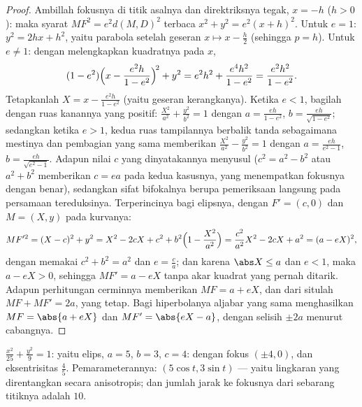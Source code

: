 \begin{proof}
Ambillah fokusnya di titik asalnya dan direktriksnya tegak, $x = -h$
($h > 0$): maka syarat $MF^2 = e^2 d(M, D)^2$ terbaca $x^2 + y^2 =
e^2 (x + h)^2$. Untuk $e = 1$: $y^2 = 2hx + h^2$, yaitu parabola setelah
geseran $x \mapsto x - \frac h2$ (sehingga $p = h$). Untuk $e \neq 1$:
dengan melengkapkan kuadratnya pada $x$,
\[
(1 - e^2)\Bigl(x - \frac{e^2 h}{1 - e^2}\Bigr)^{\!2} + y^2
= e^2h^2 + \frac{e^4 h^2}{1 - e^2}
= \frac{e^2 h^2}{1 - e^2} .
\]
Tetapkanlah $X = x - \frac{e^2h}{1-e^2}$ (yaitu geseran kerangkanya). Ketika $e < 1$,
bagilah dengan ruas kanannya yang positif:
$\frac{X^2}{a^2} + \frac{y^2}{b^2} = 1$ dengan $a = \frac{eh}{1 -
e^2}$, $b = \frac{eh}{\sqrt{1-e^2}}$; sedangkan ketika $e > 1$, kedua ruas
tampilannya berbalik tanda sebagaimana mestinya dan pembagian yang sama memberikan
$\frac{X^2}{a^2} - \frac{y^2}{b^2} = 1$ dengan $a = \frac{eh}{e^2 -
1}$, $b = \frac{eh}{\sqrt{e^2 - 1}}$. Adapun nilai $c$ yang dinyatakannya
menyusul ($c^2 = a^2 - b^2$ atau $a^2 + b^2$ memberikan $c = ea$ pada kedua
kasusnya, yang menempatkan fokusnya dengan benar), sedangkan sifat bifokalnya berupa
pemeriksaan langsung pada persamaan tereduksinya. Terperincinya bagi
elipsnya, dengan $F' = (c, 0)$ dan $M = (X, y)$ pada kurvanya:
\[
MF'^2 = (X - c)^2 + y^2
= X^2 - 2cX + c^2 + b^2\Bigl(1 - \frac{X^2}{a^2}\Bigr)
= \frac{c^2}{a^2}X^2 - 2cX + a^2
= (a - eX)^2 ,
\]
dengan memakai $c^2 + b^2 = a^2$ dan $e = \frac ca$; dan karena $\abs X \leq
a$ dan $e < 1$, maka $a - eX > 0$, sehingga $MF' = a - eX$ tanpa akar
kuadrat yang pernah ditarik. Adapun perhitungan cerminnya memberikan $MF = a + eX$,
dan dari situlah $MF + MF' = 2a$, yang tetap. Bagi hiperbolanya aljabar
yang sama menghasilkan $MF = \abs{a + eX}$ dan $MF' = \abs{eX - a}$,
dengan selisih $\pm2a$ menurut cabangnya.
\end{proof}

\begin{example}\label{ex:b1:curves:conicexample}
$\frac{x^2}{25} + \frac{y^2}{9} = 1$: yaitu elips, $a = 5$, $b = 3$, $c
= 4$: dengan fokus $(\pm4, 0)$, dan eksentrisitas $\frac45$. Pemarameterannya:
$(5\cos t, 3\sin t)$ --- yaitu lingkaran yang direntangkan secara anisotropis; dan
jumlah jarak ke fokusnya dari sebarang titiknya adalah $10$.
\end{example}

